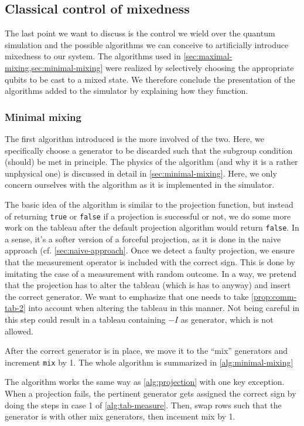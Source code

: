 \subsection{Classical control of mixedness}\label{sec:other-dingers}
The last point we want to discuss is the control we wield over the quantum
simulation and the possible algorithms we can conceive to artificially
introduce mixedness to our system. The algorithms used in
\cref{sec:maximal-mixing,sec:minimal-mixing} were realized
by selectively choosing the appropriate qubits to be cast to a mixed state.
We therefore conclude the presentation of the algorithms added to the simulator
by explaining how they function.

\subsubsection{Minimal mixing}
The first algorithm introduced is the more involved of the two. Here, we
specifically choose a generator to be discarded such that the subgroup
condition (should) be met in principle. The physics of the algorithm (and why
it is a rather unphysical one) is discussed in detail in \cref{sec:minimal-mixing}.
Here, we only concern ourselves with the algorithm as it is implemented in the
simulator.

The basic idea of the algorithm is similar to the projection function, but
instead of returning \verb|true| or \verb|false| if a projection is successful
or not, we do some more work on the tableau after the default projection
algorithm would return \verb|false|. In a sense, it's a softer version of a
forceful projection, as it is done in the naive approach (cf.
\cref{sec:naive-approach}. Once we detect a faulty projection, we ensure that
the measurement operator is included with the correct sign. This is done by
imitating the case of a measurement with random outcome. In a way, we pretend
that the projection has to alter the tableau (which is has to anyway) and
insert the correct generator. We want to emphasize that one needs to take
\cref{prop:comm-tab-2} into account when altering the tableau in this manner.
Not being careful in this step could result in a tableau containing $-I$ as
generator, which is not allowed.

After the correct generator is in place, we
move it to the \enquote{mix} generators and increment \verb|mix| by 1. The
whole algorithm is summarized in \cref{alg:minimal-mixing}

\begin{alg}\label{alg:minimal-mixing}
  The algorithm works the same way as \cref{alg:projection} with one key
  exception. When a projection fails, the pertinent generator gets assigned the
  correct sign by doing the steps in case 1 of \cref{alg:tab-measure}. Then,
  swap rows such that the generator is with other mix generators, then incement
  mix by 1.
\end{alg}

